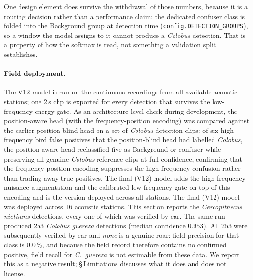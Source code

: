 \documentclass[review,3p,times]{elsarticle}
\begin{document}
\noindent One design element does survive the withdrawal of those numbers,
because it is a routing decision rather than a performance claim: the dedicated
confuser class is folded into the Background group at detection time
(\texttt{config.DETECTION\_GROUPS}), so a window the model assigns to it cannot
produce a \textit{Colobus} detection. That is a property of how the softmax is
read, not something a validation split establishes.

\paragraph{Field deployment.}
The V12 model is run on the continuous recordings from all available acoustic
stations; one 2\,s clip is exported for every detection that survives the
low-frequency energy gate. As an architecture-level check during development,
the position-aware head (with the frequency-position encoding) was compared
against the earlier position-blind head on a set of \textit{Colobus} detection
clips: of six high-frequency bird false positives that the position-blind head
had labelled \textit{Colobus}, the position-aware head reclassified
five as Background or confuser while preserving all genuine \textit{Colobus}
reference clips at full confidence, confirming that the frequency-position
encoding suppresses the high-frequency confusion rather than trading away true
positives. The final (V12) model adds the high-frequency nuisance augmentation
and the calibrated low-frequency gate on top of this encoding and is the
version deployed across all stations.
The final (V12) model was deployed across 16 acoustic stations. This section
reports the \textit{Cercopithecus nictitans} detections, every one of which was
verified by ear. The same run produced 253 \textit{Colobus guereza} detections
(median confidence 0.953). All 253 were subsequently verified by ear and
\emph{none} is a genuine roar: field precision for that class is 0.0\,\%, and
because the field record therefore contains no confirmed positive, field recall
for \textit{C.\ guereza} is not estimable from these data. We report this as a
negative result; \S\,Limitations discusses what it does and does not license.
\end{document}
